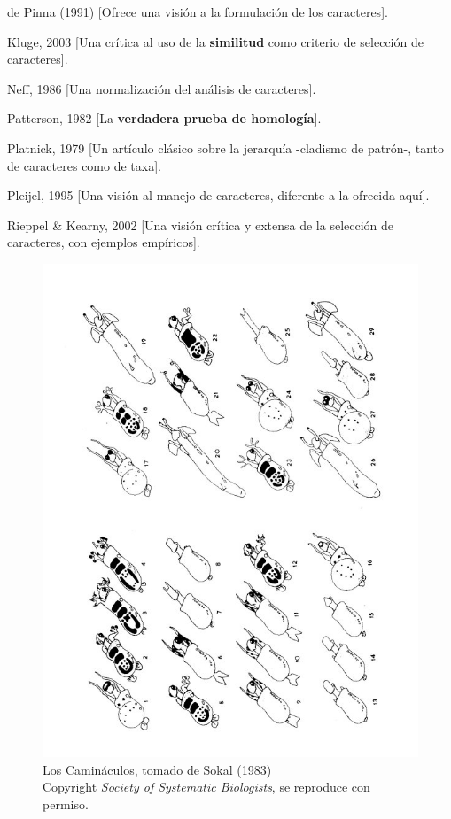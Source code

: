 %
%

de Pinna (1991) [Ofrece una visi\'on a la formulaci\'on de los caracteres].

Kluge, 2003 [Una cr\'itica al uso de la \textbf{similitud} como criterio de selecci\'on de caracteres].

Neff, 1986 [Una normalizaci\'on del an\'alisis de caracteres].

Patterson, 1982 [La \textbf{verdadera prueba de homolog\'ia}].

Platnick, 1979 [Un art\'iculo cl\'asico sobre la jerarqu\'ia -cladismo de patr\'on-, tanto de caracteres como de taxa].

Pleijel, 1995 [Una visi\'on al manejo de caracteres, diferente a la ofrecida aqu\'i].

Rieppel \& Kearny, 2002 [Una visi\'on cr\'itica y extensa de la selecci\'on de caracteres, con ejemplos emp\'iricos].

\begin{figure}
\centering
\includegraphics[scale=0.75]{./practica01/cami0.jpg}
\caption{Los Camin\'aculos, tomado de Sokal (1983) \\Copyright \textit{Society of Systematic Biologists}, se reproduce con permiso.}
\end{figure}
